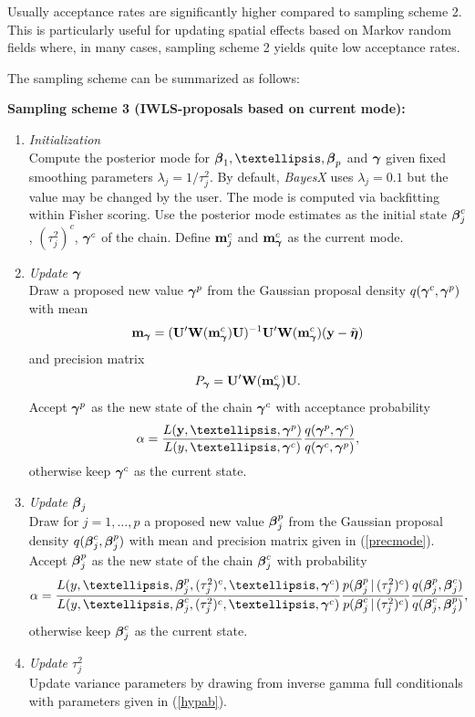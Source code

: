 \documentclass[11pt,a4paper,twoside]{bayesxarticle}
\begin{document}
Usually acceptance rates are significantly higher compared to
sampling scheme 2. This is particularly useful for updating spatial
effects based on Markov random fields where, in many cases, sampling
scheme 2 yields quite low acceptance rates.

The sampling scheme can be summarized as follows:

{\bf Sampling scheme 3 (IWLS-proposals based on current mode):}
\begin{enumerate}
\item {\em Initialization} \\
Compute the posterior mode for $\betavec_1,\dots,\betavec_p$ and $\boldsymbol{\gamma}$
given fixed smoothing parameters $\lambda_j = 1/\tau^2_j$. By
default, {\em BayesX} uses $\lambda_j = 0.1$ but the value may be
changed by the user. The mode is computed via backfitting within
Fisher scoring. Use the posterior mode estimates as the initial
state $\boldsymbol{\beta}_j^c$, $(\tau_j^2)^c$, $\boldsymbol{\gamma}^c$ of the chain. Define
$\mathbf{m}_j^c$ and $\mathbf{m}_{\boldsymbol{\gamma}}^c$ as the current mode.
\item {\em Update $\boldsymbol{\gamma}$} \\
Draw a proposed new value $\boldsymbol{\gamma}^p$ from the Gaussian proposal
density $q(\boldsymbol{\gamma}^c,\boldsymbol{\gamma}^p)$ with mean
$$
\mathbf{m}_{\boldsymbol{\gamma}} = (\mathbf{U}' \mathbf{W}(\mathbf{m}_{\boldsymbol{\gamma}}^c) \mathbf{U})^{-1}\mathbf{U}' \mathbf{W}(\mathbf{m}_{\boldsymbol{\gamma}}^c)
(\mathbf{y}-\tilde{\boldsymbol{\eta}} )
$$
and precision matrix
$$
P_{\boldsymbol{\gamma}} = \mathbf{U}' \mathbf{W}(\mathbf{m}_{\boldsymbol{\gamma}}^c) \mathbf{U}.
$$
Accept $\boldsymbol{\gamma}^p$ as the new state of the chain $\boldsymbol{\gamma}^c$ with
acceptance probability
$$
\alpha = \frac{ L(\yvec,\dots,\gammavec^p)} {L(y,\dots,\gammavec^c)} \frac{
q(\gammavec^p,\gammavec^c)}{q(\gammavec^c,\gammavec^p)},
$$
otherwise keep $\boldsymbol{\gamma}^c$ as the current state.
\item {\em Update $\boldsymbol{\beta}_j$} \\
Draw for $j=1,\dots,p$ a proposed new value $\boldsymbol{\beta}_j^p$ from the
Gaussian proposal density $q(\boldsymbol{\beta}_j^c,\boldsymbol{\beta}_j^p)$ with mean and
precision matrix given in (\ref{precmode}). Accept $\boldsymbol{\beta}^p_j$ as
the new state of the chain $\boldsymbol{\beta}_j^c$ with probability
$$
\alpha = \frac{
L(y,\dots,\betavec^{p}_j,(\tau_j^2)^{c},\dots,\gammavec^c)}
{L(y,\dots,\betavec^{c}_j,(\tau_j^2)^{c},\dots,\gammavec^c)}
\frac{p(\betavec_j^p \, | \, (\tau_j^2)^c)}{p(\betavec_j^c \, | \,
(\tau_j^2)^c)} \frac{
q(\betavec_j^p,\betavec_j^c)}{q(\betavec_j^c,\betavec_j^p)},
$$
otherwise keep $\boldsymbol{\beta}_j^c$ as the current state.
\item {\em Update $\tau^2_j$} \\
Update variance parameters by drawing from inverse gamma full
conditionals with parameters given in (\ref{hypab}).
\end{enumerate}
\end{document}
